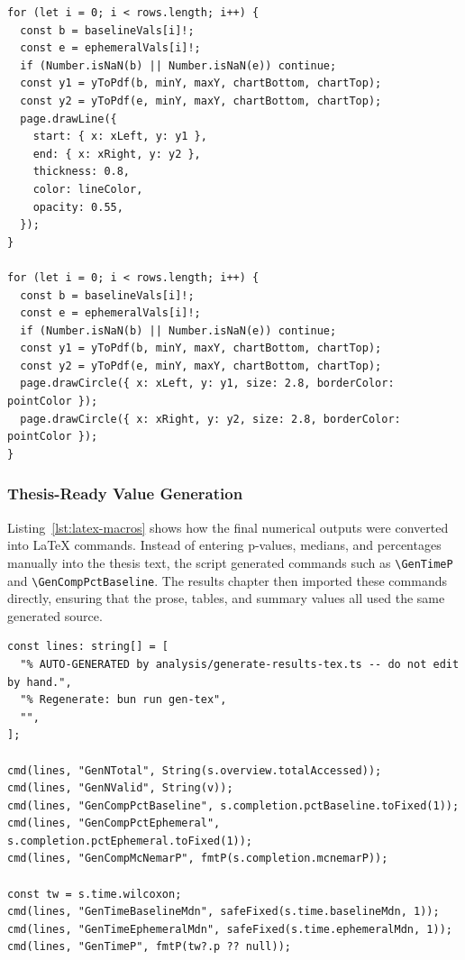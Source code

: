 \begin{appendices}
\begin{listing}[htbp]
\begin{verbatim}
for (let i = 0; i < rows.length; i++) {
  const b = baselineVals[i]!;
  const e = ephemeralVals[i]!;
  if (Number.isNaN(b) || Number.isNaN(e)) continue;
  const y1 = yToPdf(b, minY, maxY, chartBottom, chartTop);
  const y2 = yToPdf(e, minY, maxY, chartBottom, chartTop);
  page.drawLine({
    start: { x: xLeft, y: y1 },
    end: { x: xRight, y: y2 },
    thickness: 0.8,
    color: lineColor,
    opacity: 0.55,
  });
}

for (let i = 0; i < rows.length; i++) {
  const b = baselineVals[i]!;
  const e = ephemeralVals[i]!;
  if (Number.isNaN(b) || Number.isNaN(e)) continue;
  const y1 = yToPdf(b, minY, maxY, chartBottom, chartTop);
  const y2 = yToPdf(e, minY, maxY, chartBottom, chartTop);
  page.drawCircle({ x: xLeft, y: y1, size: 2.8, borderColor: pointColor });
  page.drawCircle({ x: xRight, y: y2, size: 2.8, borderColor: pointColor });
}
\end{verbatim}
\end{listing}

\subsubsection{Thesis-Ready Value Generation}

Listing~\ref{lst:latex-macros} shows how the final numerical outputs were converted into LaTeX commands. Instead of entering p-values, medians, and percentages manually into the thesis text, the script generated commands such as \verb|\GenTimeP| and \verb|\GenCompPctBaseline|. The results chapter then imported these commands directly, ensuring that the prose, tables, and summary values all used the same generated source.

\begin{listing}[htbp]
\caption{Generation of LaTeX commands used throughout the results chapter.}
\label{lst:latex-macros}
\begin{verbatim}
const lines: string[] = [
  "% AUTO-GENERATED by analysis/generate-results-tex.ts -- do not edit by hand.",
  "% Regenerate: bun run gen-tex",
  "",
];

cmd(lines, "GenNTotal", String(s.overview.totalAccessed));
cmd(lines, "GenNValid", String(v));
cmd(lines, "GenCompPctBaseline", s.completion.pctBaseline.toFixed(1));
cmd(lines, "GenCompPctEphemeral", s.completion.pctEphemeral.toFixed(1));
cmd(lines, "GenCompMcNemarP", fmtP(s.completion.mcnemarP));

const tw = s.time.wilcoxon;
cmd(lines, "GenTimeBaselineMdn", safeFixed(s.time.baselineMdn, 1));
cmd(lines, "GenTimeEphemeralMdn", safeFixed(s.time.ephemeralMdn, 1));
cmd(lines, "GenTimeP", fmtP(tw?.p ?? null));


\end{verbatim}
\end{listing}
\end{appendices}
